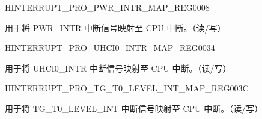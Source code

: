 



\begin{register}{H}{INTERRUPT\_PRO\_PWR\_INTR\_MAP\_REG}{\hexprefix{}0008}\label{regdesc:INTERRUPTPROPWRINTRMAPREG}
%
%
\regnewline%
\begin{regdesc}\begin{reglist}
\label{fielddesc:INTERRUPTPROPWRINTRMAP}\item [INTERRUPT\_PRO\_PWR\_INTR\_MAP] 用于将 PWR\_INTR 中断信号映射至 CPU 中断。（读/写）
\end{reglist}\end{regdesc}
\end{register}






















\begin{register}{H}{INTERRUPT\_PRO\_UHCI0\_INTR\_MAP\_REG}{\hexprefix{}0034}\label{regdesc:INTERRUPTPROUHCI0INTRMAPREG}
%
%
\regnewline%
\begin{regdesc}\begin{reglist}
\label{fielddesc:INTERRUPTPROUHCI0INTRMAP}\item [INTERRUPT\_PRO\_UHCI0\_INTR\_MAP] 用于将 UHCI0\_INTR 中断信号映射至 CPU 中断。（读/写）
\end{reglist}\end{regdesc}
\end{register}




\begin{register}{H}{INTERRUPT\_PRO\_TG\_T0\_LEVEL\_INT\_MAP\_REG}{\hexprefix{}003C}\label{regdesc:INTERRUPTPROTGT0LEVELINTMAPREG}
%
%
\regnewline%
\begin{regdesc}\begin{reglist}
\label{fielddesc:INTERRUPTPROTGT0LEVELINTMAP}\item [INTERRUPT\_PRO\_TG\_T0\_LEVEL\_INT\_MAP] 用于将 TG\_T0\_LEVEL\_INT 中断信号映射至 CPU 中断。（读/写）
\end{reglist}\end{regdesc}
\end{register}


